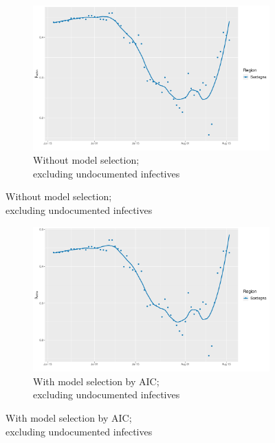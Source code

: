 \documentclass[12pt]{article}
\begin{document}
\begin{appendices}
		\begin{figure}[H]
    	    \centering
    	    \begin{subfigure}{\textwidth}
    	      \centering
    	      \includegraphics[width=0.94\linewidth]{output/model_within_lag14_betawithin_Isole_rolling.pdf}
    	      \caption{Without model selection; \\ excluding undocumented infectives}
    	      \label{fig:beta_within_over_time_isole_regular}
    	    \end{subfigure}\newline
        \end{figure}
        \begin{figure}[H]\ContinuedFloat
    	    \begin{subfigure}{\textwidth}
    	      \centering
    	      \includegraphics[width=0.94\linewidth]{output/model_within_lag14_betawithin_Isole_aic_rolling.pdf}
    	      \caption{With model selection by AIC; \\ excluding undocumented infectives}
    	      \label{fig:beta_within_over_time_isole_aic}
    	    \end{subfigure}

\end{figure}
\end{appendices}
\end{document}
